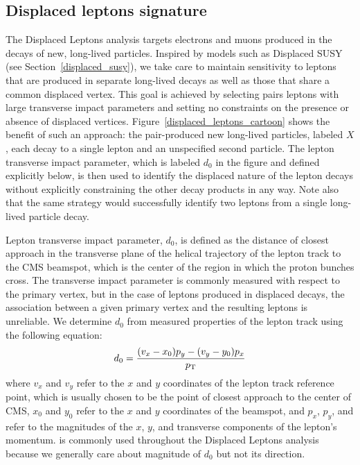 \subsection{Displaced leptons signature}
The Displaced Leptons analysis targets electrons and muons produced in the decays of new, long-lived particles. Inspired by models such as Displaced SUSY (see Section~\ref{displaced_susy}), we take care to maintain sensitivity to leptons that are produced in separate long-lived decays as well as those that share a common displaced vertex. This goal is achieved by selecting pairs leptons with large transverse impact parameters and setting no constraints on the presence or absence of displaced vertices. Figure~\ref{displaced_leptons_cartoon} shows the benefit of such an approach: the pair-produced new long-lived particles, labeled $X$, each decay to a single lepton and an unspecified second particle. The lepton transverse impact parameter, which is labeled $d_0$ in the figure and defined explicitly below, is then used to identify the displaced nature of the lepton decays without explicitly constraining the other decay products in any way. Note also that the same strategy would successfully identify two leptons from a single long-lived particle decay.



Lepton transverse impact parameter, $d_0$, is defined as the distance of closest approach in the transverse plane of the helical trajectory of the lepton track to the CMS beamspot, which is the center of the region in which the proton bunches cross. The transverse impact parameter is commonly measured with respect to the primary vertex, but in the case of leptons produced in displaced decays, the association between a given primary vertex and the resulting leptons is unreliable. We determine $d_0$ from measured properties of the lepton track using the following equation:
\begin{equation}
    d_0 = \frac{(v_x - x_0)p_y - (v_y - y_0)p_x}{p_{\mathrm{T}}}
\end{equation}
where $v_x$ and $v_y$ refer to the $x$ and $y$ coordinates of the lepton track reference point, which is usually chosen to be the point of closest approach to the center of CMS, $x_0$ and $y_0$ refer to the $x$ and $y$ coordinates of the beamspot, and $p_x$, $p_y$, and \pt refer to the magnitudes of the $x$, $y$, and transverse components of the lepton's momentum. \ad is commonly used throughout the Displaced Leptons analysis because we generally care about magnitude of $d_0$ but not its direction.

